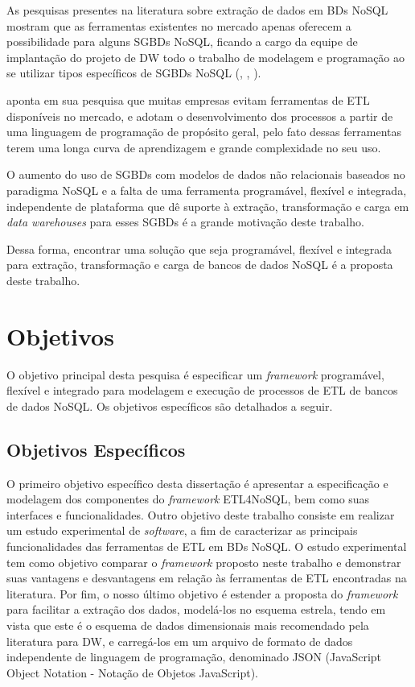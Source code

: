 As pesquisas presentes na literatura sobre extração de dados em BDs NoSQL mostram que as ferramentas existentes no mercado apenas oferecem a possibilidade para alguns SGBDs NoSQL, ficando a cargo da equipe de implantação do projeto de DW todo o trabalho de modelagem e programação ao se utilizar tipos específicos de SGBDs NoSQL (\cite{silva:2016}, \cite{chevalier:2015}, \cite{liu:2013}).

\cite{silva:2012} aponta em sua pesquisa que muitas empresas evitam ferramentas de ETL disponíveis no mercado, e adotam o desenvolvimento dos processos a partir de uma linguagem de programação de propósito geral, pelo fato dessas ferramentas terem uma longa curva de aprendizagem e grande complexidade no seu uso.

O aumento do uso de SGBDs com modelos de dados não relacionais baseados no paradigma NoSQL e a falta de uma ferramenta programável, flexível e integrada, independente de plataforma que dê suporte à extração, transformação e carga em \textit{data warehouses} para esses SGBDs é a grande motivação deste trabalho.

Dessa forma, encontrar uma solução que seja programável, flexível e integrada para extração, transformação e carga de bancos de dados NoSQL é a proposta deste trabalho.





\section{Objetivos}

O objetivo principal desta pesquisa é especificar um \textit{framework} programável, flexível e integrado para modelagem e execução de processos de ETL de bancos de dados NoSQL. Os objetivos específicos são detalhados a seguir.

\subsection{Objetivos Específicos}

O primeiro objetivo específico desta dissertação é apresentar a especificação e modelagem dos componentes do \textit{framework} ETL4NoSQL, bem como suas interfaces e funcionalidades. Outro objetivo deste trabalho consiste em realizar um estudo experimental de \textit{software}, a fim de caracterizar as principais funcionalidades das ferramentas de ETL em BDs NoSQL. O estudo experimental tem como objetivo comparar o \textit{framework} proposto neste trabalho e demonstrar suas vantagens e desvantagens em relação às ferramentas de ETL encontradas na literatura. Por fim, o nosso último objetivo é estender a proposta do \textit{framework} para facilitar a extração dos dados, modelá-los no esquema estrela, tendo em vista que este é o esquema de dados dimensionais mais recomendado pela literatura para DW, e carregá-los em um arquivo de formato de dados independente de linguagem de programação, denominado JSON (JavaScript Object Notation - Notação de Objetos JavaScript).

